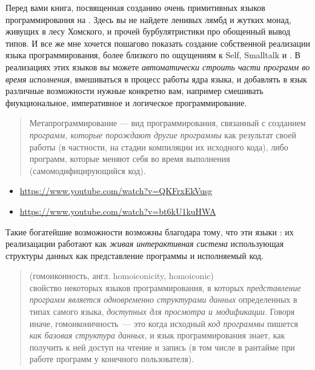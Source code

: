 \secdown

Перед вами книга, посвященная созданию очень примитивных языков программирования
на \py. Здесь вы не найдете ленивых лямбд и жутких монад, живущих в лесу
Хомского, и прочей бурбулятристики про обощенный вывод типов.
И все же мне хочется пошагово показать создание собственной реализации языка
программирования, более близкого по ощущениям к Self, Smalltalk и \lisp.
В реализациях этих языков вы можете \emph{автоматически строить части программ
во время исполнения}, вмешиваться в процесс работы ядра языка, и добавлять в
язык различные возможности нужные конкретно вам, например смешивать
фнукциональное, императивное и логическое программирование.

\begin{quotation}\noindent
Метапрограммирование — вид программирования, связанный с созданием
\textit{программ, которые порождают другие программы} как результат своей работы
(в частности, на стадии компиляции их исходного кода), либо программ, которые
меняют себя во время выполнения (самомодифицирующийся код).
\end{quotation}

\begin{itemize}
  \item 
\url{https://www.youtube.com/watch?v=QKFrxEkVusg}
  \item 
\url{https://www.youtube.com/watch?v=bt6kU1kuHWA}
\end{itemize}

Такие богатейшие возможности  возможны благодара
тому, что эти языки : их реализацации работают как
\emph{живая интерактивная система} использующая структуры данных как
представление программы и исполняемый код.

\begin{quotation}\noindent
{} (гомоиконность, англ. homoiconicity, homoiconic)\\
свойство некоторых языков программирования, в которых \emph{представление
программ является одновременно структурами данных} определенных в типах самого
языка, \emph{доступных для просмотра и модификации}. Говоря иначе,
гомоиконичность\ --- это когда исходный \textit{код программы} пишется
\textit{как базовая структура данных}, и язык программирования знает, как
получить к ней доступ на чтение и запись (в том числе в рантайме при работе
программ у конечного пользователя).
\end{quotation}

